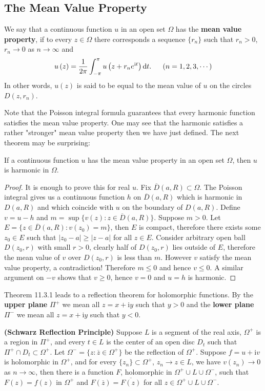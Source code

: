 \subsection{The Mean Value Property}
We say that a continuous function $u$ in an open set $\Omega$ has the \textbf{mean value property}, if to every $z\in\Omega$ there corresponds a sequence $\{r_n\}$ such that $r_n>0$, $r_n\to 0$ as $n\to\infty$ and 
$$
u\left( z \right) =\frac{1}{2\pi}\int_{-\pi}^{\pi}{u\left( z+r_ne^{\mathrm{i}t} \right) \mathrm{d}t}.\hspace{0.5cm}\left( n=1,2,3,\cdots \right) 
$$
In other words, $u(z)$ is said to be equal to the mean value of $u$ on the circles $D(z,r_n)$.\par
Note that the Poisson integral formula guarantees that every harmonic function satisfies the mean value property. One may see that the harmonic satisfies a rather "stronger" mean value property then we have just defined. The next theorem may be surprising: 
\begin{theorem}
If a continuous function $u$ has the mean value property in an open set $\Omega$, then $u$ is harmonic in $\Omega$.
\end{theorem}
\begin{proof}
It is enough to prove this for real $u$. Fix $\overline{D}(a,R)\subset\Omega$. The Poisson integral gives us a continuous function $h$ on $\overline{D}(a,R)$ which is harmonic in $D(a,R)$ and which coincide with $u$ on the boundary of $D(a,R)$. Define $v=u-h$ and $m=\sup\{v(z):z\in\overline{D}(a,R)\}$. Suppose $m>0$. Let $E=\{z\in\overline{D}(a,R):v(z_0)=m\}$, then $E$ is compact, therefore there exists some $z_0\in E$ such that $|z_0-a|\ge |z-a|$ for all $z\in E$. Consider arbitrary open ball $D(z_0,r)$ with small $r>0$, clearly half of $D(z_0,r)$ lies outside of $E$, therefore the mean value of $v$ over $D(z_0,r)$ is less than $m$. However $v$ satisfy the mean value property, a contradiction! Therefore $m\le 0$ and hence $v\le 0$. A similar argument on $-v$ shows that $v\ge 0$, hence $v=0$ and $u=h$ is harmonic.
\end{proof}
Theorem 11.3.1 leads to a reflection theorem for holomorphic functions. By the \textbf{upper plane} $\Pi^+$ we mean all $z=x+\mathrm{i}y$ such that $y>0$ and the \textbf{lower plane} $\Pi^-$ we mean all $z=x+\mathrm{i}y$ such that $y<0$.
\begin{theorem}{\textbf{(Schwarz Reflection Principle)}}
Suppose $L$ is a segment of the real axis, $\Omega^+$ is a region in $\Pi^+$, and every $t\in L$ is the center of an open disc $D_t$ such that $\Pi^+\cap D_t\subset\Omega^+$. Let $\Omega^-=\{z:\overline{z}\in\Omega^+\}$ be the reflection of $\Omega^+$. Suppose $f=u+\mathrm{i}v$ is holomorphic in $\Omega^+$, and for every $\{z_n\}\subset\Omega^+$, $z_n\to z\in L$, we have $v(z_n)\to 0$ as $n\to\infty$, then there is a function $F$, holomorphic in $\Omega^+\cup L\cup\Omega^-$, such that $F(z)=f(z)$ in $\Omega^+$ and $F(\overline{z})=\overline{F(z)}$ for all $z\in\Omega^+\cup L\cup\Omega^-$.
\end{theorem}
